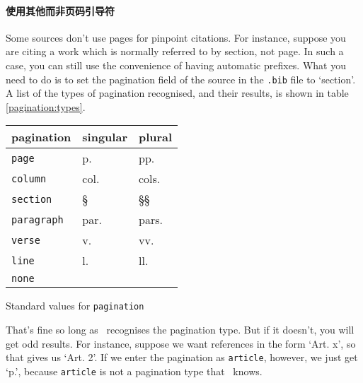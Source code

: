 \paragraph{使用其他而非页码引导符} Some sources
don't use pages for pinpoint citations. For instance, suppose you are
citing a work which is normally referred to by section, not page. In
such a case, you can still use the convenience of having automatic
prefixes. What you need to do is to set the pagination field of the
source in the \texttt{.bib} file to `section'. A list of the types of
pagination recognised, and their results, is shown in table
\ref{pagination:types}.
\begin{margintable}
\begin{tabular}{lll}
  \toprule
  \textsf{pagination} & \textsf{singular} & \textsf{plural} \\
  \midrule
  \texttt{page}       & p.                & pp.             \\
  \texttt{column}     & col.              & cols.           \\
  \texttt{section}    & \S                & \S\S            \\
  \texttt{paragraph}  & par.              & pars.           \\
  \texttt{verse}      & v.                & vv.             \\
  \texttt{line}       & l.                & ll.             \\
  \texttt{none}                                             \\
  \bottomrule
\end{tabular}
\vspace{3pt}
\caption{Standard values for \texttt{pagination}\label{pagination:types}}
\end{margintable}


That’s fine so long as \biblatex\ recognises the pagination type. But if
it doesn't, you will get odd results. For instance, suppose we want
references in the form `Art. x', so that  gives us
`Art. 2'. If we enter the pagination as \texttt{article}, however, we
just get `p.', because \texttt{article} is not a
pagination type that \biblatex\ knows.

